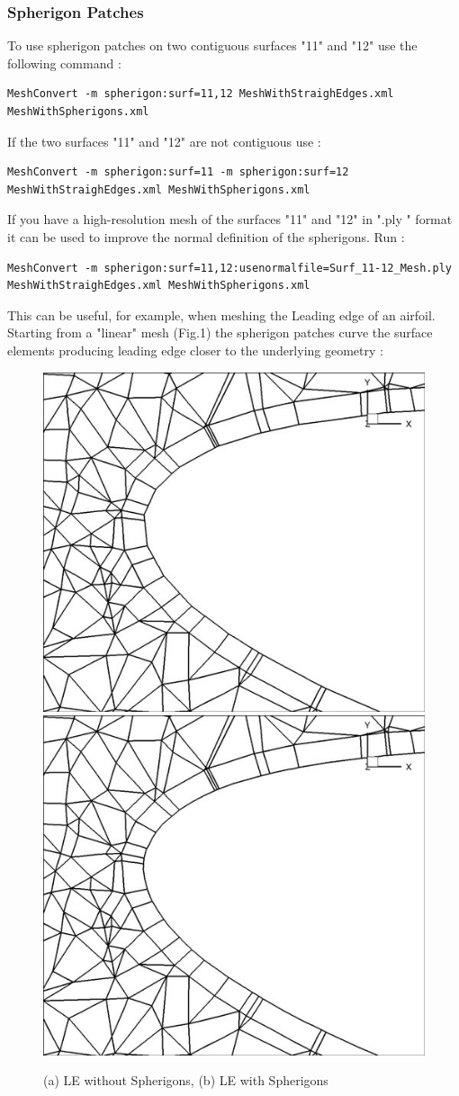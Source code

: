 \subsubsection{Spherigon Patches}
To use spherigon patches on two contiguous surfaces "11" and "12" use the following command :
\begin{lstlisting}[style=XmlStyle]
MeshConvert -m spherigon:surf=11,12 MeshWithStraighEdges.xml MeshWithSpherigons.xml
\end{lstlisting}
If the two surfaces "11" and "12" are not contiguous use :
\begin{lstlisting}[style=XmlStyle]
MeshConvert -m spherigon:surf=11 -m spherigon:surf=12 MeshWithStraighEdges.xml MeshWithSpherigons.xml
\end{lstlisting}
If you have a high-resolution mesh of the surfaces "11" and "12" in ".ply " format it can be used to improve the normal definition of the spherigons. Run :
\begin{lstlisting}[style=XmlStyle]
MeshConvert -m spherigon:surf=11,12:usenormalfile=Surf_11-12_Mesh.ply
MeshWithStraighEdges.xml MeshWithSpherigons.xml 
\end{lstlisting}
This can be useful, for example, when meshing the Leading edge of an airfoil. Starting from a "linear" mesh (Fig.1) the spherigon patches curve the surface elements producing leading edge closer to the underlying geometry :
\begin{figure}[!htbp]
\begin{center}
\includegraphics[width = 0.47 \textwidth]{Figures/noSphnoBL.jpg}
\includegraphics[width = 0.47 \textwidth]{Figures/SphnoBL.jpg}
\caption{(a) LE without Spherigons, (b) LE with Spherigons}
\label{fig:}
\end{center}
\end{figure}
